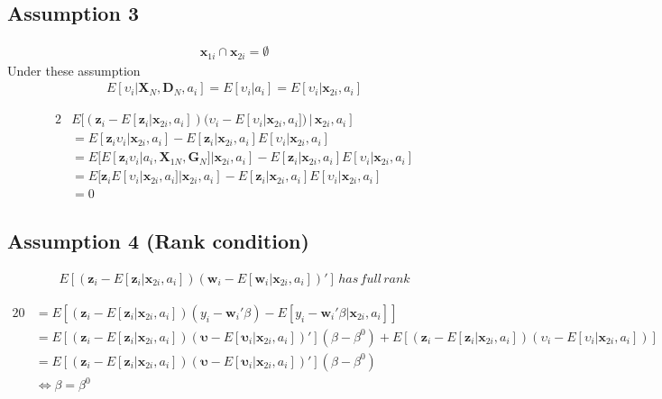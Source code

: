 \documentclass[11pt]{article}
\begin{document}
\subsection{Assumption 3} 
\begin{align}
\mathbf{x}_{1i} \cap \mathbf{x}_{2i} = \emptyset \nonumber
\end{align}
Under these assumption 
\begin{align}
E[\upsilon_i | \mathbf{X}_N, \mathbf{D}_N, a_i] = E[\upsilon_i | a_i] = E[\upsilon_i | \mathbf{x}_{2i},a_i]
\end{align}

\begin{alignat}{2}
 &E[(\mathbf{z}_i - E[\mathbf{z}_i|\mathbf{x}_{2i},a_i]) (\upsilon_i - E[\upsilon_i | \mathbf{x}_{2i},a_i]) \, | \, \mathbf{x}_{2i},a_i] \nonumber \\
 &= E[\mathbf{z}_i\upsilon_i | \mathbf{x}_{2i},a_i] - E[\mathbf{z}_i|\mathbf{x}_{2i},a_i]E[\upsilon_i | \mathbf{x}_{2i},a_i]        \nonumber \\
 &= E[E[\mathbf{z}_i\upsilon_i | a_i,\mathbf{X}_{1N}, \mathbf{G}_{N}]|\mathbf{x}_{2i},a_i] - E[\mathbf{z}_i|\mathbf{x}_{2i},a_i]E[\upsilon_i | \mathbf{x}_{2i},a_i]	\nonumber \\
 &= E[\mathbf{z}_iE[\upsilon_i | \mathbf{x}_{2i},a_i]|\mathbf{x}_{2i},a_i] - E[\mathbf{z}_i|\mathbf{x}_{2i},a_i]E[\upsilon_i | \mathbf{x}_{2i},a_i]	\nonumber \\
 & = 0 
\end{alignat}
\subsection{Assumption 4 (Rank condition)} 
  \begin{align}
E[(\mathbf{z}_i - E[\mathbf{z}_i|\mathbf{x}_{2i},a_i]) (\mathbf{w}_i - E[\mathbf{w}_i | \mathbf{x}_{2i},a_i])'] \, has \, full \, rank
  \end{align}

\begin{alignat}{2}
0 &= E[(\mathbf{z}_i - E[\mathbf{z}_i|\mathbf{x}_{2i},a_i])(y_i - \mathbf{w}_i'\beta) - E[y_i - \mathbf{w}_i'\beta | \mathbf{x}_{2i},a_i] ]        \nonumber \\
 &= E[(\mathbf{z}_i - E[\mathbf{z}_i|\mathbf{x}_{2i},a_i])(\mathbf{\upsilon}-E[\mathbf{\upsilon}_i | \mathbf{x}_{2i},a_i])'](\beta -\beta^0) + E[(\mathbf{z}_i - E[\mathbf{z}_i|\mathbf{x}_{2i},a_i])(\upsilon_i - E[\upsilon_i | \mathbf{x}_{2i},a_i])] \nonumber \\
 &= E[(\mathbf{z}_i - E[\mathbf{z}_i|\mathbf{x}_{2i},a_i])(\mathbf{\upsilon}-E[\mathbf{\upsilon}_i | \mathbf{x}_{2i},a_i])'](\beta -\beta^0)	\nonumber \\
 &\Leftrightarrow \beta = \beta^0
\end{alignat}
\end{document}
